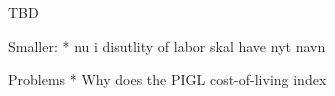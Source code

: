 
TBD 



Smaller: 
* nu i disutlity of labor skal have nyt navn 


Problems 
* Why does the PIGL cost-of-living index 